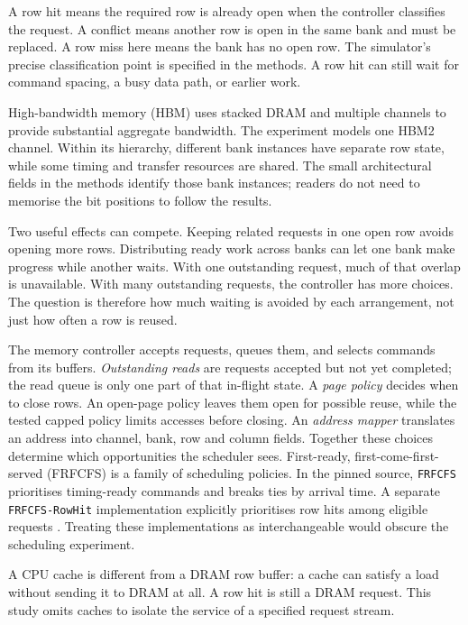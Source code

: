 \documentclass[11pt,a4paper]{report}
\begin{document}
A row hit means the required row is already open when the controller classifies the request. A conflict means another row is open in the same bank and must be replaced. A row miss here means the bank has no open row. The simulator's precise classification point is specified in the methods. A row hit can still wait for command spacing, a busy data path, or earlier work.

High-bandwidth memory (HBM) uses stacked DRAM and multiple channels to provide substantial aggregate bandwidth. The experiment models one HBM2 channel. Within its hierarchy, different bank instances have separate row state, while some timing and transfer resources are shared. The small architectural fields in the methods identify those bank instances; readers do not need to memorise the bit positions to follow the results.

Two useful effects can compete. Keeping related requests in one open row avoids opening more rows. Distributing ready work across banks can let one bank make progress while another waits. With one outstanding request, much of that overlap is unavailable. With many outstanding requests, the controller has more choices. The question is therefore how much waiting is avoided by each arrangement, not just how often a row is reused.

The memory controller accepts requests, queues them, and selects commands from its buffers. \emph{Outstanding reads} are requests accepted but not yet completed; the read queue is only one part of that in-flight state. A \emph{page policy} decides when to close rows. An open-page policy leaves them open for possible reuse, while the tested capped policy limits accesses before closing. An \emph{address mapper} translates an address into channel, bank, row and column fields. Together these choices determine which opportunities the scheduler sees. First-ready, first-come-first-served (FRFCFS) is a family of scheduling policies. In the pinned source, \texttt{FRFCFS} prioritises timing-ready commands and breaks ties by arrival time. A separate \texttt{FRFCFS-RowHit} implementation explicitly prioritises row hits among eligible requests \cite{ramsource}. Treating these implementations as interchangeable would obscure the scheduling experiment.

A CPU cache is different from a DRAM row buffer: a cache can satisfy a load without sending it to DRAM at all. A row hit is still a DRAM request. This study omits caches to isolate the service of a specified request stream.
\end{document}
